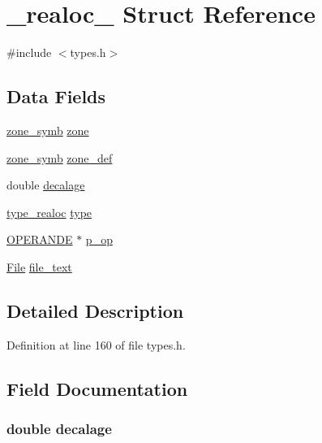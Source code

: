 \hypertarget{struct__realoc__}{\section{\-\_\-realoc\-\_\- Struct Reference}
\label{struct__realoc__}
}


{\ttfamily \#include $<$types.\-h$>$}

\subsection*{Data Fields}
\begin{DoxyCompactItemize}
\item 
\hyperlink{types_8h_a706120c40630aa23c560dd0144b0f2c0}{zone\-\_\-symb} \hyperlink{struct__realoc___a6a70ab3aecc26de50260bd4e04c43c9b}{zone}
\item 
\hyperlink{types_8h_a706120c40630aa23c560dd0144b0f2c0}{zone\-\_\-symb} \hyperlink{struct__realoc___a3a3c25f44514d114fd68d7abbcf4bbd0}{zone\-\_\-def}
\item 
double \hyperlink{struct__realoc___aac945295366b3dadfd1ec0da01eb6cb8}{decalage}
\item 
\hyperlink{types_8h_aeb4098ae19b2f9e7374c3aae4bf639f7}{type\-\_\-realoc} \hyperlink{struct__realoc___ab48aff16626535d3a6e1af121e232797}{type}
\item 
\hyperlink{types_8h_af7ef87d0454864b6fbf214bdd4ec3165}{O\-P\-E\-R\-A\-N\-D\-E} $\ast$ \hyperlink{struct__realoc___ac5417b27354bd5623a8b5869c23bfe1c}{p\-\_\-op}
\item 
\hyperlink{file_8h_ab04aa57a6150b637aa20235ca023731e}{File} \hyperlink{struct__realoc___a70b00fb5dc5e9b0b072a72dbe243a8f1}{file\-\_\-text}
\end{DoxyCompactItemize}


\subsection{Detailed Description}


Definition at line 160 of file types.\-h.



\subsection{Field Documentation}
\hypertarget{struct__realoc___aac945295366b3dadfd1ec0da01eb6cb8}{
\subsubsection[{decalage}]{\setlength{\rightskip}{0pt plus 5cm}double decalage}}\label{struct__realoc___aac945295366b3dadfd1ec0da01eb6cb8}


